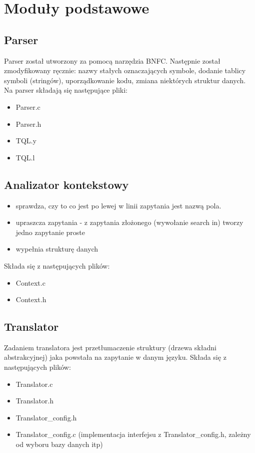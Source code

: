 \documentclass{pracamgr}
\begin{document}
\section{Moduły podstawowe}

\subsection{Parser}
Parser został utworzony za pomocą narzędzia BNFC. Następnie został zmodyfikowany ręcznie: nazwy stałych oznaczających symbole, 
dodanie tablicy symboli (stringów), uporządkowanie kodu, zmiana niektórych struktur danych. Na parser składają się następujące pliki:
\begin{itemize}
 \item Parser.c
\item Parser.h
\item TQL.y %
\item TQL.l %
\end{itemize}



\subsection{Analizator kontekstowy}
\begin{itemize}
 \item sprawdza, czy to co jest po lewej w linii zapytania jest nazwą pola.
\item upraszcza zapytania - z zapytania złożonego (wywołanie search in) tworzy jedno zapytanie proste
\item wypełnia strukturę danych
\end{itemize}
Składa się z następujących plików:
\begin{itemize}
 \item Context.c
 \item Context.h
\end{itemize}

\subsection{Translator}
Zadaniem translatora jest przetłumaczenie struktury (drzewa składni abstrakcyjnej) jaka powstała na zapytanie w danym języku. 
Składa się z następujących plików:
\begin {itemize}
 \item Translator.c
 \item Translator.h
 \item Translator\_config.h
 \item Translator\_config.c (implementacja interfejsu z Translator\_config.h, zależny od wyboru bazy danych itp)
\end {itemize}
\end{document}
